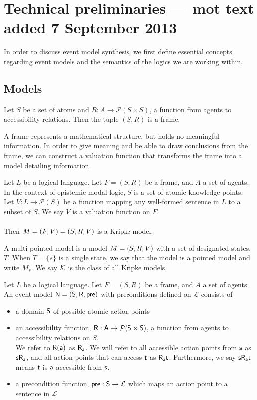 \section{Technical preliminaries --- mot text added 7 September 2013}
In order to discuss event model synthesis, we first define essential concepts regarding event
models and the semantics of the logics we are working within.

\subsection{Models}

\begin{defn} \label{frame}
	Let $S$ be a set of atoms and $R: A \to \mathcal{P}(S \times S)$, a function from agents to
	accessibility relations.
	Then the tuple $(S, R)$ is a frame.
\end{defn}

A frame represents a mathematical structure, but holds no meaningful information.
In order to give meaning and be able to draw conclusions from the frame, we can
construct a valuation function that transforms the frame into a model detailing
information.
\begin{defn} \label{model}
	Let $L$ be a logical language.
	Let $F = (S, R)$ be a frame, and $A$ a set of agents.
	In the context of epistemic modal logic, $S$ is a set of atomic knowledge points.
	Let $V: L \to \mathcal{P}(S)$ be a function mapping any
	well-formed	sentence in $L$ to a subset of $S$.
	We say $V$ is a valuation function on $F$.\\
	\\
	Then $M = (F, V) = (S, R, V)$ is a Kripke
	model.
\end{defn}
A multi-pointed model is a model $M = (S, R, V)$ with a set of designated states, $T$.
When $T = \{s\}$ is a single state, we say that the model is a pointed model and write $M_s$.
We say $\mathcal{K}$ is the class of all Kripke models.

\begin{defn} \label{evModel}
	Let $L$ be a logical language.
	Let $F = (S, R)$ be a frame, and $A$ a set of agents.
	An event model $\mathrm{\mathsf{\mathrm{\mathsf{N}} = (S, R, pre)}}$ with preconditions defined on $\mathcal{L}$ consists of
	\begin{itemize}
		\item a domain $\mathrm{\mathsf{S}}$ of possible atomic action points
		\item an accessibility function, $\mathrm{\mathsf{R: A \to \mathcal{P}(S \times
        S)}}$, a function from agents to
		accessibility relations on $S$.\\
		We refer to $\mathrm{\mathsf{R(a)}}$ as $\mathrm{\mathsf{R_a}}$.
		We will refer to all accessible action points from $\mathrm{\mathsf{s}}$ as
    $\mathrm{\mathsf{s R_a}}$, and all action points that
		can access $\mathrm{\mathsf{t}}$ as $\mathrm{\mathsf{R_a t}}$.
		Furthermore, we say $\mathrm{\mathsf{s R_a t}}$ means $\mathrm{\mathsf{t}}$ is
    $\mathrm{\mathsf{a}}$-accessible from $\mathrm{\mathsf{s}}$.
		\item a precondition function, $\mathrm{\mathsf{pre: S}} \to \mathcal{L}$ which maps an action point to a
		sentence in $\mathcal{L}$
	\end{itemize}
\end{defn}

